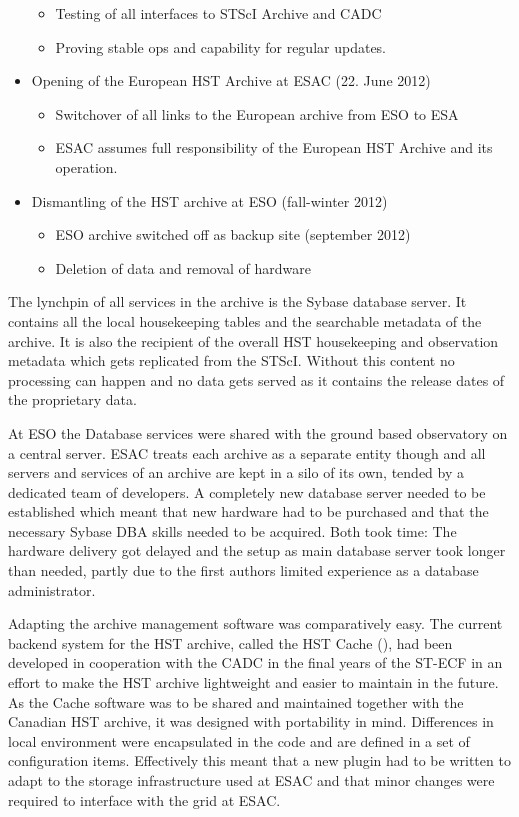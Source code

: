 \documentclass[11pt,twoside]{article}  %
\begin{document}
\begin{itemize}
\begin{itemize}
\item	Testing of all interfaces to STScI Archive and CADC
\item	Proving stable ops and capability for regular updates.
\end{itemize} \itemsep0pt \parskip0pt  
\item Opening of the European HST Archive at ESAC  (22. June 2012)
\begin{itemize}
\item Switchover of all links to the European archive from ESO to ESA
\item ESAC assumes full responsibility of the European HST Archive and its operation.
\end{itemize} \itemsep0pt \parskip0pt 
\item Dismantling of the HST archive at ESO (fall-winter 2012)
\begin{itemize} \itemsep0pt \parskip0pt 
\item ESO archive switched off as backup site (september 2012) 
\item Deletion of data and removal of hardware
\end{itemize}
\end{itemize}


The lynchpin of all services in the archive is the Sybase database server. It contains all the local housekeeping tables and the searchable metadata of the archive. 
It is also the recipient of the overall HST housekeeping  and observation metadata which gets replicated from the STScI. Without this content no processing can happen and no data gets served as it contains the release dates of the proprietary data.
  
At ESO the Database services were shared with the ground based observatory on a central server. ESAC treats each archive as a separate entity though and all servers and services of an archive are kept in a silo of its own, tended by a dedicated team of developers.
A completely new database server needed to be established which meant that new hardware had to be purchased and that the necessary Sybase DBA skills needed to be acquired. Both took time: The hardware delivery got delayed and the setup as main database server took longer than needed, partly due to the first authors limited experience as a database administrator.

Adapting the archive management software was comparatively easy. The current backend system for the HST archive, called the HST Cache (\cite{2010ASPC..434..275H}),  had been developed in cooperation with the CADC in the final years of the ST-ECF in an effort to make the HST archive lightweight and easier to maintain in the future. As the Cache software was to be shared and maintained together with the Canadian HST archive, it was designed with portability in mind. Differences in local environment were encapsulated in the code and are defined in a set of configuration items. Effectively this meant that a new plugin had to be written to adapt to the storage infrastructure used at ESAC and that minor changes were required to interface with the grid at ESAC. 
\end{document}
